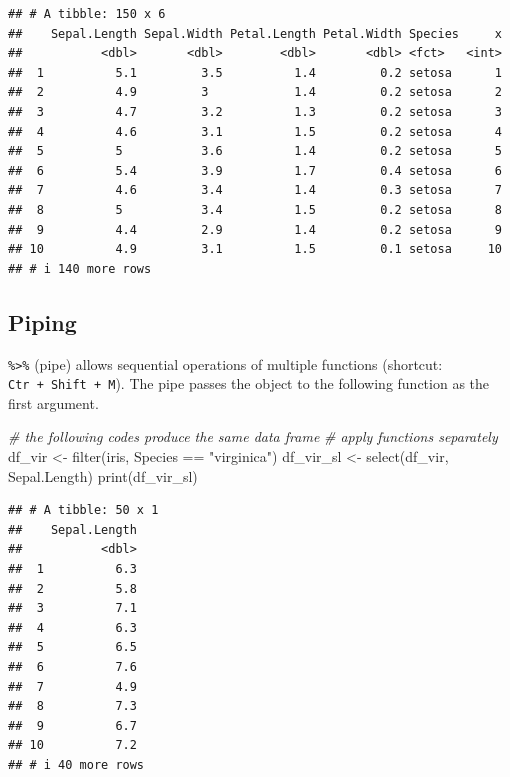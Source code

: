 \documentclass[
]{book}
\newenvironment{Shaded}{\begin{snugshade}}{\end{snugshade}}
\newcommand{\CommentTok}[1]{\textcolor[rgb]{0.56,0.35,0.01}{\textit{#1}}}
\newcommand{\FunctionTok}[1]{\textcolor[rgb]{0.00,0.00,0.00}{#1}}
\newcommand{\NormalTok}[1]{#1}
\newcommand{\OtherTok}[1]{\textcolor[rgb]{0.56,0.35,0.01}{#1}}
\newcommand{\SpecialCharTok}[1]{\textcolor[rgb]{0.00,0.00,0.00}{#1}}
\newcommand{\StringTok}[1]{\textcolor[rgb]{0.31,0.60,0.02}{#1}}
\begin{document}
\begin{verbatim}
## # A tibble: 150 x 6
##    Sepal.Length Sepal.Width Petal.Length Petal.Width Species     x
##           <dbl>       <dbl>        <dbl>       <dbl> <fct>   <int>
##  1          5.1         3.5          1.4         0.2 setosa      1
##  2          4.9         3            1.4         0.2 setosa      2
##  3          4.7         3.2          1.3         0.2 setosa      3
##  4          4.6         3.1          1.5         0.2 setosa      4
##  5          5           3.6          1.4         0.2 setosa      5
##  6          5.4         3.9          1.7         0.4 setosa      6
##  7          4.6         3.4          1.4         0.3 setosa      7
##  8          5           3.4          1.5         0.2 setosa      8
##  9          4.4         2.9          1.4         0.2 setosa      9
## 10          4.9         3.1          1.5         0.1 setosa     10
## # i 140 more rows
\end{verbatim}

\hypertarget{piping}{%
\subsection{Piping}\label{piping}}

\texttt{\%\textgreater{}\%} (pipe) allows sequential operations of multiple functions (shortcut: \texttt{Ctr\ +\ Shift\ +\ M}). The pipe passes the object to the following function as the first argument.

\begin{Shaded}
\begin{Highlighting}[]
\CommentTok{\# the following codes produce the same data frame}
\CommentTok{\# apply functions separately}
\NormalTok{df\_vir }\OtherTok{\textless{}{-}} \FunctionTok{filter}\NormalTok{(iris, Species }\SpecialCharTok{==} \StringTok{"virginica"}\NormalTok{)}
\NormalTok{df\_vir\_sl }\OtherTok{\textless{}{-}} \FunctionTok{select}\NormalTok{(df\_vir, Sepal.Length)}
\FunctionTok{print}\NormalTok{(df\_vir\_sl)}
\end{Highlighting}
\end{Shaded}

\begin{verbatim}
## # A tibble: 50 x 1
##    Sepal.Length
##           <dbl>
##  1          6.3
##  2          5.8
##  3          7.1
##  4          6.3
##  5          6.5
##  6          7.6
##  7          4.9
##  8          7.3
##  9          6.7
## 10          7.2
## # i 40 more rows
\end{verbatim}
\end{document}
